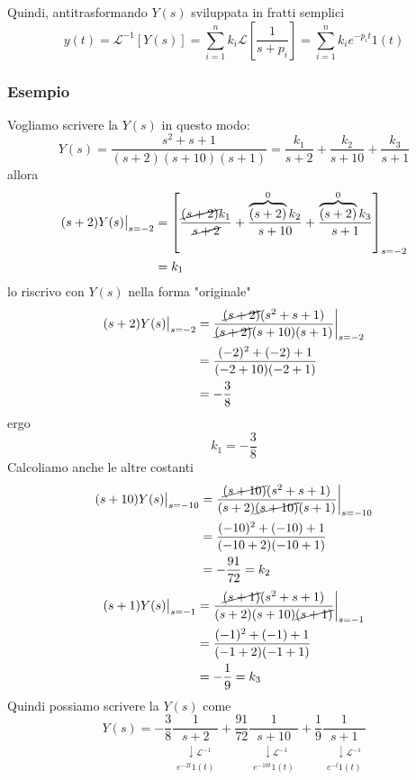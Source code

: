 \documentclass{article}
\numberwithin{equation}{subsection}
\begin{document}
Quindi, antitrasformando $Y(s)$ sviluppata in fratti semplici
\begin{equation}
    y(t) = \mathcal{L}^{-1} \left[Y(s)\right] = \sum_{i=1}^n k_i \mathcal{L}\left[\frac{1}{s+p_i}\right] = \sum_{i=1}^n k_i e^{-p_i t} 1(t)
\end{equation}


\subsubsection{Esempio}
Vogliamo scrivere la $Y(s)$ in questo modo:
\[
    Y(s) = \frac{s^2+s+1}{(s+2)(s+10)(s+1)} = \frac{k_1}{s+2} + \frac{k_2}{s+10} + \frac{k_3}{s+1}
\]
allora
\begin{align*}
    (s+2)Y(s) \big|_{s=-2} &= \left[\frac{\cancel{(s+2)}k_1}{\cancel{s+2}} + \frac{\overbrace{(s+2)}^{0}k_2}{s+10} + \frac{\overbrace{(s+2)}^{0}k_3}{s+1}\right]_{s=-2}\\
    &= k_1
\end{align*}
lo riscrivo con $Y(s)$ nella forma "originale"
\begin{align*}
    (s+2)Y(s) \big|_{s=-2} &= 
    \frac{\cancel{(s+2)}(s^2+s+1)}{\cancel{(s+2)}(s+10)(s+1)} \bigg|_{s=-2}\\
    &=\frac{(-2)^2 + (-2)+1}{(-2+10)(-2+1)} \\
    &= - \frac{3}{8}
\end{align*}
ergo
\[
    k_1 = - \frac{3}{8}
\]
Calcoliamo anche le altre costanti
\begin{align*}
    (s+10)Y(s) \big|_{s=-10} &= 
    \frac{\cancel{(s+10)}(s^2+s+1)}{(s+2)\cancel{(s+10)}(s+1)} \bigg|_{s=-10}\\
    &=\frac{(-10)^2 + (-10)+1}{(-10+2)(-10+1)} \\
    &= - \frac{91}{72} = k_2
\end{align*}
\begin{align*}
    (s+1)Y(s) \big|_{s=-1} &= 
    \frac{\cancel{(s+1)}(s^2+s+1)}{(s+2)(s+10)\cancel{(s+1)}} \bigg|_{s=-1}\\
    &=\frac{(-1)^2 + (-1)+1}{(-1+2)(-1+1)} \\
    &= - \frac{1}{9} = k_3
\end{align*}
Quindi possiamo scrivere la $Y(s)$ come
\[
    Y(s) = - \frac{3}{8} \frac{1}{\underset{\substack{ \ \ \ \ \  \downarrow \mathcal{L}^{-1} \\ e^{-2t}1(t)}}{s+2}} + \frac{91}{72} \frac{1}{\underset{\substack{ \ \ \ \ \  \downarrow \mathcal{L}^{-1} \\ e^{-10t}1(t)}}{s+10}} + \frac{1}{9} \frac{1}{\underset{\substack{ \ \ \ \ \  \downarrow \mathcal{L}^{-1} \\ e^{-t}1(t)}}{s+1}}
\]
\end{document}
